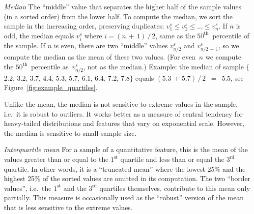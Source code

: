 \begin{Description}
\item[\it Median]
\OutputRowText{\OutputRowIDMedian}
The ``middle'' value that separates the higher half of the sample values
(in a sorted order) from the lower half.
To compute the median, we sort the sample in the increasing order, preserving
duplicates: $v^s_1 \leq v^s_2 \leq \ldots \leq v^s_n$.
If $n$ is odd, the median equals $v^s_i$ where $i = (n\,{+}\,1)\,{/}\,2$,
same as the $50^{\textrm{th}}$~percentile of the sample.
If $n$ is even, there are two ``middle'' values $v^s_{n/2}$ and $v^s_{n/2\,+\,1}$,
so we compute the median as the mean of these two values.
(For even~$n$ we compute the $50^{\textrm{th}}$~percentile as~$v^s_{n/2}$,
not as the median.)  Example: the median of sample
$\{$2.2, 3.2, 3.7, 4.4, 5.3, 5.7, 6.1, 6.4, 7.2, 7.8$\}$
equals $(5.3\,{+}\,5.7)\,{/}\,2$~${=}$~5.5, see Figure~\ref{fig:example_quartiles}.

Unlike the mean, the median is not sensitive to extreme values in the sample,
i.e.\ it is robust to outliers.  It works better as a measure of central tendency
for heavy-tailed distributions and features that vary on exponential scale.
However, the median is sensitive to small sample size.
\item[\it Interquartile mean]
\OutputRowText{\OutputRowIDIQMean}
For a sample of a quantitative feature, this is
the mean of the values greater than or equal to the $1^{\textrm{st}}$ quartile
and less than or equal the $3^{\textrm{rd}}$ quartile.
In other words, it is a ``truncated mean'' where the lowest 25$\%$ and
the highest 25$\%$ of the sorted values are omitted in its computation.
The two ``border values'', i.e.\ the $1^{\textrm{st}}$ and the $3^{\textrm{rd}}$
quartiles themselves, contribute to this mean only partially.
This measure is occasionally used as the ``robust'' version of the mean
that is less sensitive to the extreme values.


\end{Description}

